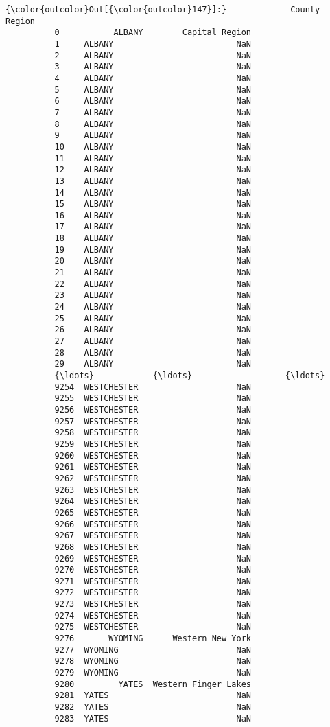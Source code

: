 \documentclass[11pt]{article}
\begin{document}
\begin{Verbatim}[commandchars=\\\{\}]
{\color{outcolor}Out[{\color{outcolor}147}]:}             County                Region
          0           ALBANY        Capital Region
          1     ALBANY                         NaN
          2     ALBANY                         NaN
          3     ALBANY                         NaN
          4     ALBANY                         NaN
          5     ALBANY                         NaN
          6     ALBANY                         NaN
          7     ALBANY                         NaN
          8     ALBANY                         NaN
          9     ALBANY                         NaN
          10    ALBANY                         NaN
          11    ALBANY                         NaN
          12    ALBANY                         NaN
          13    ALBANY                         NaN
          14    ALBANY                         NaN
          15    ALBANY                         NaN
          16    ALBANY                         NaN
          17    ALBANY                         NaN
          18    ALBANY                         NaN
          19    ALBANY                         NaN
          20    ALBANY                         NaN
          21    ALBANY                         NaN
          22    ALBANY                         NaN
          23    ALBANY                         NaN
          24    ALBANY                         NaN
          25    ALBANY                         NaN
          26    ALBANY                         NaN
          27    ALBANY                         NaN
          28    ALBANY                         NaN
          29    ALBANY                         NaN
          {\ldots}            {\ldots}                   {\ldots}
          9254  WESTCHESTER                    NaN
          9255  WESTCHESTER                    NaN
          9256  WESTCHESTER                    NaN
          9257  WESTCHESTER                    NaN
          9258  WESTCHESTER                    NaN
          9259  WESTCHESTER                    NaN
          9260  WESTCHESTER                    NaN
          9261  WESTCHESTER                    NaN
          9262  WESTCHESTER                    NaN
          9263  WESTCHESTER                    NaN
          9264  WESTCHESTER                    NaN
          9265  WESTCHESTER                    NaN
          9266  WESTCHESTER                    NaN
          9267  WESTCHESTER                    NaN
          9268  WESTCHESTER                    NaN
          9269  WESTCHESTER                    NaN
          9270  WESTCHESTER                    NaN
          9271  WESTCHESTER                    NaN
          9272  WESTCHESTER                    NaN
          9273  WESTCHESTER                    NaN
          9274  WESTCHESTER                    NaN
          9275  WESTCHESTER                    NaN
          9276       WYOMING      Western New York
          9277  WYOMING                        NaN
          9278  WYOMING                        NaN
          9279  WYOMING                        NaN
          9280         YATES  Western Finger Lakes
          9281  YATES                          NaN
          9282  YATES                          NaN
          9283  YATES                          NaN
          

\end{Verbatim}
\end{document}
